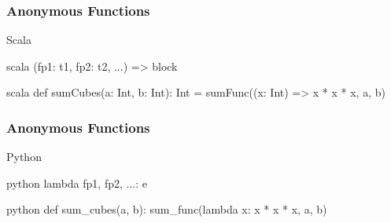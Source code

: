 \documentclass[dvipsnames]{beamer}
\theoremstyle{plain}
\begin{document}
\begin{frame}[fragile]
  \frametitle{Anonymous Functions}

  \begin{block}{Scala}
    \begin{pygments}{scala}
      (fp1: t1, fp2: t2, ...) => block
    \end{pygments}
  \end{block}

  \medskip
  \begin{example}
    \begin{pygments}{scala}
def sumCubes(a: Int, b: Int): Int =
    sumFunc((x: Int) => x * x * x, a, b)
    \end{pygments}
  \end{example}
\end{frame}

\begin{frame}[fragile]
  \frametitle{Anonymous Functions}

  \begin{block}{Python}
    \begin{pygments}{python}
      lambda fp1, fp2, ...: e
    \end{pygments}
  \end{block}

  \medskip
  \begin{example}
    \begin{pygments}{python}
def sum_cubes(a, b):
    sum_func(lambda x: x * x * x, a, b)
    \end{pygments}
  \end{example}
\end{frame}
\end{document}
